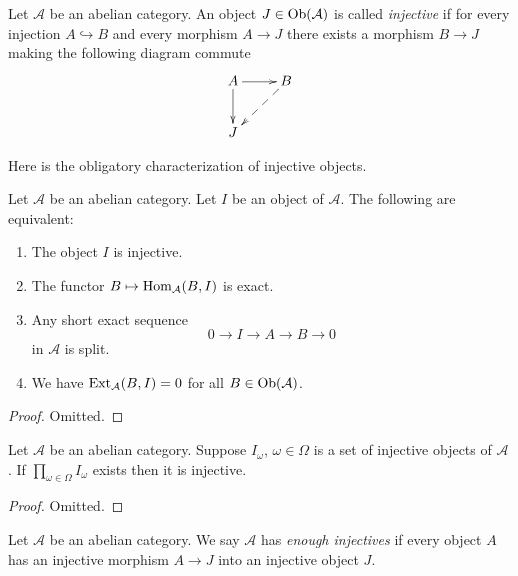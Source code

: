 \begin{definition}
\label{definition-injective}
Let $\mathcal{A}$ be an abelian category.
An object $J \in \mathop{\mathrm{Ob}}\nolimits(\mathcal{A})$ is
called {\it injective} if for every injection
$A \hookrightarrow B$ and every morphism
$A \to J$ there exists a morphism $B \to J$ making
the following diagram commute
$$
\xymatrix{
A \ar[r] \ar[d] & B \ar@{-->}[ld] \\
J &
}
$$
\end{definition}

\noindent
Here is the obligatory characterization of injective objects.

\begin{lemma}
\label{lemma-characterize-injectives}
Let $\mathcal{A}$ be an abelian category.
Let $I$ be an object of $\mathcal{A}$.
The following are equivalent:
\begin{enumerate}
\item The object $I$ is injective.
\item The functor $B \mapsto \mathop{\mathrm{Hom}}\nolimits_\mathcal{A}(B, I)$
is exact.
\item Any short exact sequence
$$
0 \to I \to A \to B \to 0
$$
in $\mathcal{A}$ is split.
\item We have $\mathop{\mathrm{Ext}}\nolimits_\mathcal{A}(B, I) = 0$ for
all $B \in \mathop{\mathrm{Ob}}\nolimits(\mathcal{A})$.
\end{enumerate}
\end{lemma}

\begin{proof}
Omitted.
\end{proof}

\begin{lemma}
\label{lemma-product-injectives}
Let $\mathcal{A}$ be an abelian category.
Suppose $I_\omega$, $\omega \in \Omega$ is a set of injective
objects of $\mathcal{A}$. If $\prod_{\omega \in \Omega} I_\omega$
exists then it is injective.
\end{lemma}

\begin{proof}
Omitted.
\end{proof}

\begin{definition}
\label{definition-enough-injectives}
Let $\mathcal{A}$ be an abelian category.
We say $\mathcal{A}$ has {\it enough injectives}
if every object $A$ has an injective morphism
$A \to J$ into an injective object $J$.
\end{definition}

